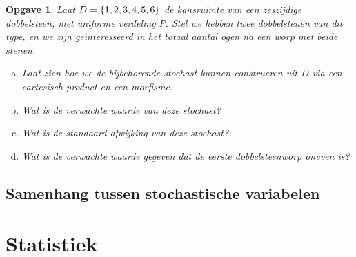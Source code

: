 \documentclass[a4paper]{book}
\newtheorem{exercise}[theorem]{Opgave}
\theoremstyle{definition}
\begin{document}
\begin{exercise}
    Laat $D = \set{1,2,3,4,5,6}$ de kansruimte van een zeszijdige dobbelsteen, met uniforme verdeling $P$.
    Stel we hebben twee dobbelstenen van dit type, en we zijn ge\"{\i}nteresseerd in het totaal aantal ogen na een worp met beide stenen.
    \begin{enumerate}[a.]
    \item Laat zien hoe we de bijbehorende stochast kunnen construeren uit $D$ via een cartesisch product en een morfisme.
    \item Wat is de verwachte waarde van deze stochast?
    \item Wat is de standaard afwijking van deze stochast?
    \item Wat is de verwachte waarde gegeven dat de eerste dobbelsteenworp oneven is?
    \end{enumerate}
\end{exercise}


\section{Samenhang tussen stochastische variabelen}



\chapter{Statistiek}
\end{document}
